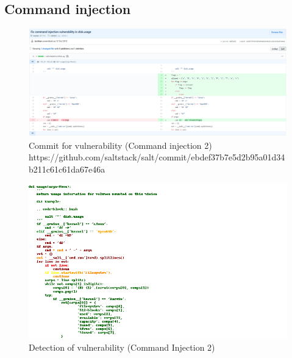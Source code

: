 \documentclass[
a4paper,
pagesize,
pdftex,
12pt,
twoside, %
BCOR=5mm, %
ngerman,
fleqn,
final,
]{scrartcl}
\begin{document}
		
		
		\subsection{Command injection}
		
		\begin{figure}[H]
			\centering
			\includegraphics[width=\linewidth]{Images/command_injectionA}
			\caption{Commit for vulnerability (Command injection 2) \newline \scriptsize{https://github.com/saltstack/salt/commit/ebdef37b7e5d2b95a01d34b211c61c61da67e46a}}
			\label{fig:command_injectionA}
		\end{figure}
		\begin{figure}[H]
			\centering
			\includegraphics[width=\linewidth]{Images/command_injectionAr}
			\caption{Detection of vulnerability (Command Injection 2)}
			\label{fig:command_injectionAr}
		\end{figure}
		
\end{document}

